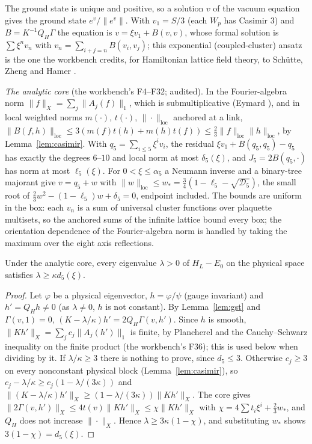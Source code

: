 The ground state is unique and positive, so a solution $v$ of the vacuum equation gives the ground state $e^v/\|e^v\|$. With $v_1=S/3$ (each $W_p$ has Casimir $3$) and $B=K^{-1}Q_H\Gamma$ the equation is $v=\xi v_1+B(v,v)$, whose formal solution is $\sum\xi^nv_n$ with $v_n=\sum_{i+j=n}B(v_i,v_j)$; this exponential (coupled-cluster) ansatz is the one the workbench credits, for Hamiltonian lattice field theory, to Schütte, Zheng and Hamer \cite{SchutteZhengHamer}.

\emph{The analytic core} (the workbench's F4--F32; audited). In the Fourier-algebra norm $\|f\|_X=\sum_j\|A_j(f)\|_1$, which is submultiplicative (Eymard \cite{Eymard}), and in local weighted norms $m(\cdot)$, $t(\cdot)$, $\|\cdot\|_{\mathrm{loc}}$ anchored at a link, $\|B(f,h)\|_{\mathrm{loc}}\le3(m(f)t(h)+m(h)t(f))\le\frac23\|f\|_{\mathrm{loc}}\|h\|_{\mathrm{loc}}$, by Lemma~\ref{lem:casimir}. With $q_5=\sum_{i\le5}\xi^iv_i$, the residual $\xi v_1+B(q_5,q_5)-q_5$ has exactly the degrees $6$--$10$ and local norm at most $\delta_5(\xi)$, and $J_5=2B(q_5,\cdot)$ has norm at most $\ell_5(\xi)$. For $0<\xi\le\alpha_5$ a Neumann inverse and a binary-tree majorant give $v=q_5+w$ with $\|w\|_{\mathrm{loc}}\le w_*=\frac34(1-\ell_5-\sqrt{\mathcal D_5})$, the small root of $\frac23w^2-(1-\ell_5)w+\delta_5=0$, endpoint included. The bounds are uniform in the box: each $v_n$ is a sum of universal cluster functions over plaquette multisets, so the anchored sums of the infinite lattice bound every box; the orientation dependence of the Fourier-algebra norm is handled by taking the maximum over the eight axis reflections.

\begin{proposition}\label{prop:return}
Under the analytic core, every eigenvalue $\lambda>0$ of $H_L-E_0$ on the physical space satisfies $\lambda\ge\kappa d_5(\xi)$.
\end{proposition}
\begin{proof}
Let $\varphi$ be a physical eigenvector, $h=\varphi/\psi$ (gauge invariant) and $h'=Q_Hh\neq0$ (as $\lambda\neq0$, $h$ is not constant). By Lemma~\ref{lem:gst} and $\Gamma(v,1)=0$, $(K-\lambda/\kappa)h'=2Q_H\Gamma(v,h')$. Since $h$ is smooth, $\|Kh'\|_X=\sum_jc_j\|A_j(h')\|_1$ is finite, by Plancherel and the Cauchy--Schwarz inequality on the finite product (the workbench's F36); this is used below when dividing by it. If $\lambda/\kappa\ge3$ there is nothing to prove, since $d_5\le3$. Otherwise $c_j\ge3$ on every nonconstant physical block (Lemma~\ref{lem:casimir}), so $c_j-\lambda/\kappa\ge c_j(1-\lambda/(3\kappa))$ and $\|(K-\lambda/\kappa)h'\|_X\ge(1-\lambda/(3\kappa))\|Kh'\|_X$. The core gives $\|2\Gamma(v,h')\|_X\le4t(v)\|Kh'\|_X\le\chi\|Kh'\|_X$ with $\chi=4\sum t_i\xi^i+\frac23w_*$, and $Q_H$ does not increase $\|\cdot\|_X$. Hence $\lambda\ge3\kappa(1-\chi)$, and substituting $w_*$ shows $3(1-\chi)=d_5(\xi)$.
\end{proof}

